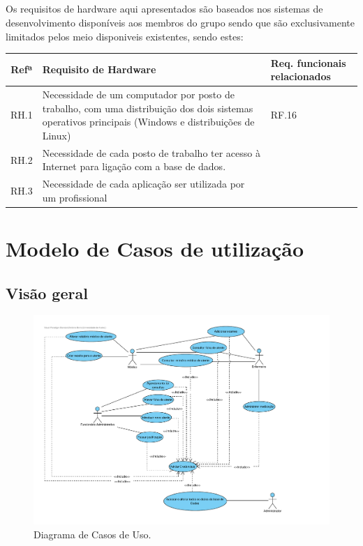 \documentclass[11pt,a4paper,twoside]{report}
\begin{document}
\paragraph{}

Os requisitos de hardware aqui apresentados são baseados nos sistemas de desenvolvimento disponíveis aos membros do grupo sendo que são exclusivamente limitados pelos meio disponiveis existentes, sendo estes:

\begin{tabularx}{\textwidth}{|c|X|p{}|}
	\hline
	\textbf{Refª} 	& \textbf{Requisito de Hardware}  & \textbf{Req. funcionais relacionados}  \\
	\hline
	RH.1      & Necessidade de um computador por posto de trabalho, com uma distribuição dos dois sistemas operativos principais (Windows e distribuições de Linux)     &  RF.16  \\
	\hline
	RH.2     & Necessidade de cada posto de trabalho ter acesso à Internet para ligação com a base de dados.   &   \\
\hline
	RH.3     & Necessidade de cada aplicação ser utilizada por um profissional   &   \\
\hline
\end{tabularx}

\chapter{Modelo de Casos de utilização}

\section{Visão geral}

\begin{figure}[H]
	\centering
	\includegraphics[width=0.95\linewidth]{image/Medico}
	\caption [Diagrama de Casos de Uso.] {Diagrama de Casos de Uso.}
	\label{fig:DiagramaCasoUso}
\end{figure}
\end{document}
